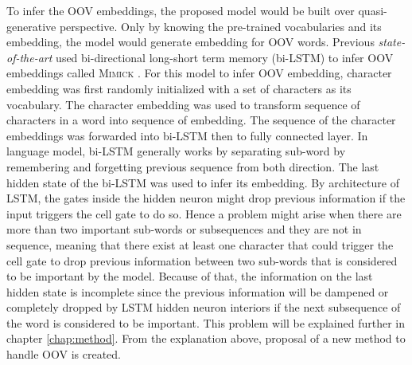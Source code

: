     To infer the OOV embeddings, the proposed model would be built
    over quasi-generative perspective. Only by knowing the pre-trained
    vocabularies and its embedding, the model would generate embedding
    for OOV words. Previous \textit{state-of-the-art} used
    bi-directional long-short term memory (bi-LSTM) to infer OOV
    embeddings called \textsc{Mimick} \citep{mimicking2017Pinter}. For
    this model to infer OOV embedding, character embedding was first
    randomly initialized with a set of characters as its vocabulary.
    The character embedding was used to transform sequence of
    characters in a word into sequence of embedding. The sequence of
    the character embeddings was forwarded into bi-LSTM then to fully
    connected layer. In language model, bi-LSTM generally works by
    separating sub-word by remembering and forgetting previous
    sequence from both direction. The last hidden state of the bi-LSTM
    was used to infer its embedding. By architecture of LSTM, the
    gates inside the hidden neuron might drop previous information if
    the input triggers the cell gate to do so. Hence a problem might
    arise when there are more than two important sub-words or
    subsequences and they are not in sequence, meaning that there
    exist at least one character that could trigger the cell gate to
    drop previous information between two sub-words that is considered
    to be important by the model. Because of that, the information on
    the last hidden state is incomplete since the previous information
    will be dampened or completely dropped by LSTM hidden neuron
    interiors if the next subsequence of the word is considered to be
    important. This problem will be explained further in chapter
    \ref{chap:method}. From the explanation above, proposal of a new
    method to handle OOV is created.

